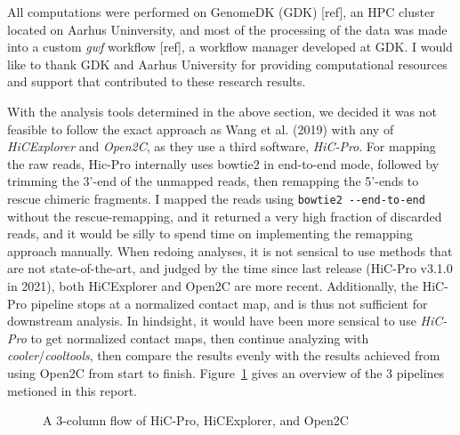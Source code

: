 \documentclass[
  11pt,
  a4paper,
]{scrbook}
\let\oldemph\emph
\renewcommand\emph[1]{\oldemph{\color{gray}#1}}
\begin{document}
All computations were performed on GenomeDK (GDK) {[}ref{]}, an HPC
cluster located on Aarhus Uninversity, and most of the processing of the
data was made into a custom \emph{gwf} workflow {[}ref{]}, a workflow
manager developed at GDK. I would like to thank GDK and Aarhus
University for providing computational resources and support that
contributed to these research results.

With the analysis tools determined in the above section, we decided it
was not feasible to follow the exact approach as Wang et al. (2019) with
any of \emph{HiCExplorer} and \emph{Open2C}, as they use a third
software, \emph{HiC-Pro}. For mapping the raw reads, Hic-Pro internally
uses bowtie2 in end-to-end mode, followed by trimming the 3'-end of the
unmapped reads, then remapping the 5'-ends to rescue chimeric fragments.
I mapped the reads using \texttt{bowtie2\ -\/-end-to-end} without the
rescue-remapping, and it returned a very high fraction of discarded
reads, and it would be silly to spend time on implementing the remapping
approach manually. When redoing analyses, it is not sensical to use
methods that are not state-of-the-art, and judged by the time since last
release (HiC-Pro v3.1.0 in 2021), both HiCExplorer and Open2C are more
recent. Additionally, the HiC-Pro pipeline stops at a normalized contact
map, and is thus not sufficient for downstream analysis. In hindsight,
it would have been more sensical to use \emph{HiC-Pro} to get normalized
contact maps, then continue analyzing with
\emph{cooler}/\emph{cooltools}, then compare the results evenly with the
results achieved from using Open2C from start to finish.
Figure~\ref{fig-hic-tools-comparison} gives an overview of the 3
pipelines metioned in this report.

\begin{figure}


\caption{\label{fig-hic-tools-comparison}A 3-column flow of HiC-Pro,
HiCExplorer, and Open2C}

\end{figure}%
\end{document}
